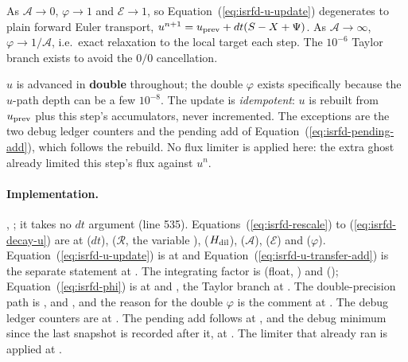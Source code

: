 As
$\mathcal{A}\to 0$, $\varphi \to 1$ and $\mathcal{E}\to 1$, so
Equation~(\ref{eq:isrfd-u-update}) degenerates to plain forward Euler transport,
$u^{n+1} = u_{\rm prev} + dt(S - X + \Psi)$. As $\mathcal{A}\to\infty$,
$\varphi \to 1/\mathcal{A}$, i.e.\ exact relaxation to the local target each
step. The $10^{-6}$ Taylor branch exists to avoid the $0/0$ cancellation.

$u$ is advanced in \textbf{double} throughout; the double
$\varphi$ exists specifically because the $u$-path depth can be a few $10^{-8}$.
The update is \emph{idempotent}: $u$ is
rebuilt from $u_{\rm prev}$ plus this step's accumulators, never incremented.
The exceptions are the two debug ledger counters and the pending add of
Equation~(\ref{eq:isrfd-pending-add}), which follows the rebuild. No flux limiter is applied
here: the extra ghost already limited this step's flux against $u^n$.

\paragraph{Implementation.} ,
; it takes no $dt$ argument (line 535).
Equations~(\ref{eq:isrfd-rescale}) to (\ref{eq:isrfd-decay-u}) are at
 ($dt$),  ($\mathcal{R}$, the variable
),  ($H_{\rm dil}$),  ($\mathcal{A}$),
 ($\mathcal{E}$) and  ($\varphi$).
Equation~(\ref{eq:isrfd-u-update}) is at  and
Equation~(\ref{eq:isrfd-u-transfer-add}) is the separate statement at
. The integrating factor is
 (float, )
and 
(); Equation~(\ref{eq:isrfd-phi})
is at  and
, the Taylor branch at
. The double-precision path is
,  and , and the
reason for the double $\varphi$ is the comment at
. The debug ledger counters are at
. The pending add follows at
, and the debug minimum since the last snapshot
is recorded after it, at . The limiter that
already ran is applied at .


